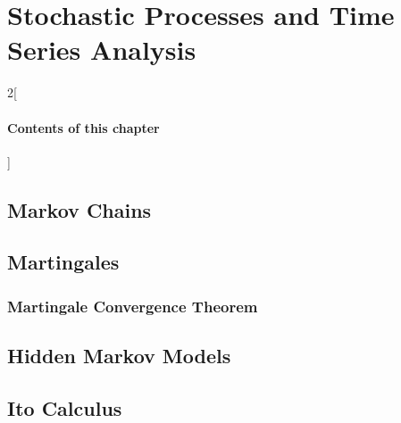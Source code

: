 \chapter{Stochastic Processes and Time Series Analysis}

\begin{multicols}{2}[\subsubsection*{Contents of this chapter}]
\end{multicols}


\section{Markov Chains}

\section{Martingales}
\subsection{Martingale Convergence Theorem}

\section{Hidden Markov Models}

\section{Ito Calculus}